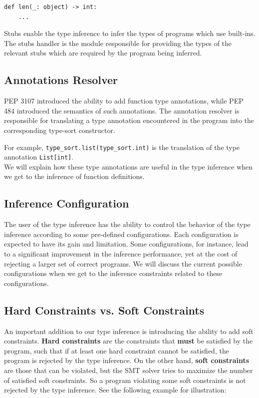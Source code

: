 \begin{lstlisting}
def len(_: object) -> int:
	...
\end{lstlisting}

Stubs enable the type inference to infer the types of programs which use built-ins. The stubs handler is the module responsible for providing the types of the relevant stubs which are required by the program being inferred.

\subsection{Annotations Resolver}
PEP 3107 \cite{3107} introduced the ability to add function type annotations, while PEP 484 \cite{484} introduced the semantics of such annotations. The annotation resolver is responsible for translating a type annotation encountered in the program into the corresponding type-sort constructor.

For example, \lstinline|type_sort.list(type_sort.int)| is the translation of the type annotation \lstinline|List[int]|.\\

We will explain how these type annotations are useful in the type inference when we get to the inference of function definitions.
\subsection{Inference Configuration}\label{sub:config}
The user of the type inference has the ability to control the behavior of the type inference according to some pre-defined configurations. Each configuration is expected to have its gain and limitation. Some configurations, for instance, lead to a significant improvement in the inference performance, yet at the cost of rejecting a larger set of correct programs. We will discuss the current possible configurations when we get to the inference constraints related to these configurations.
\subsection{Hard Constraints vs. Soft Constraints}
An important addition to our type inference is introducing the ability to add soft constraints. \textbf{Hard constraints} are the constraints that \textbf{must} be satisfied by the program, such that if at least one hard constraint cannot be satisfied, the program is rejected by the type inference. On the other hand, \textbf{soft constraints} are those that can be violated, but the SMT solver tries to maximize the number of satisfied soft constraints. So a program violating some soft constraints is not rejected by the type inference. See the following example for illustration:

